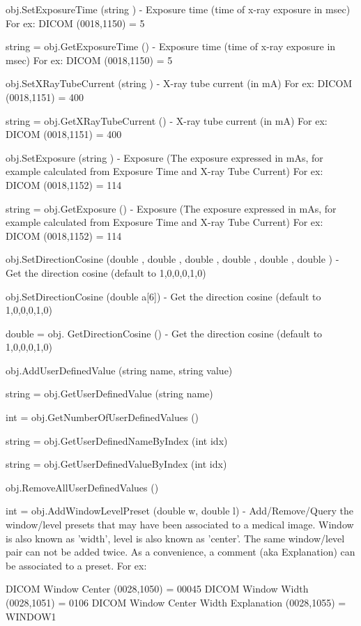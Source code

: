 \begin{DoxyItemize}
\item {\ttfamily obj.\-Set\-Exposure\-Time (string )} -\/ Exposure time (time of x-\/ray exposure in msec) For ex\-: D\-I\-C\-O\-M (0018,1150) = 5  
\item {\ttfamily string = obj.\-Get\-Exposure\-Time ()} -\/ Exposure time (time of x-\/ray exposure in msec) For ex\-: D\-I\-C\-O\-M (0018,1150) = 5  
\item {\ttfamily obj.\-Set\-X\-Ray\-Tube\-Current (string )} -\/ X-\/ray tube current (in m\-A) For ex\-: D\-I\-C\-O\-M (0018,1151) = 400  
\item {\ttfamily string = obj.\-Get\-X\-Ray\-Tube\-Current ()} -\/ X-\/ray tube current (in m\-A) For ex\-: D\-I\-C\-O\-M (0018,1151) = 400  
\item {\ttfamily obj.\-Set\-Exposure (string )} -\/ Exposure (The exposure expressed in m\-As, for example calculated from Exposure Time and X-\/ray Tube Current) For ex\-: D\-I\-C\-O\-M (0018,1152) = 114  
\item {\ttfamily string = obj.\-Get\-Exposure ()} -\/ Exposure (The exposure expressed in m\-As, for example calculated from Exposure Time and X-\/ray Tube Current) For ex\-: D\-I\-C\-O\-M (0018,1152) = 114  
\item {\ttfamily obj.\-Set\-Direction\-Cosine (double , double , double , double , double , double )} -\/ Get the direction cosine (default to 1,0,0,0,1,0)  
\item {\ttfamily obj.\-Set\-Direction\-Cosine (double a\mbox{[}6\mbox{]})} -\/ Get the direction cosine (default to 1,0,0,0,1,0)  
\item {\ttfamily double = obj. Get\-Direction\-Cosine ()} -\/ Get the direction cosine (default to 1,0,0,0,1,0)  
\item {\ttfamily obj.\-Add\-User\-Defined\-Value (string name, string value)}  
\item {\ttfamily string = obj.\-Get\-User\-Defined\-Value (string name)}  
\item {\ttfamily int = obj.\-Get\-Number\-Of\-User\-Defined\-Values ()}  
\item {\ttfamily string = obj.\-Get\-User\-Defined\-Name\-By\-Index (int idx)}  
\item {\ttfamily string = obj.\-Get\-User\-Defined\-Value\-By\-Index (int idx)}  
\item {\ttfamily obj.\-Remove\-All\-User\-Defined\-Values ()}  
\item {\ttfamily int = obj.\-Add\-Window\-Level\-Preset (double w, double l)} -\/ Add/\-Remove/\-Query the window/level presets that may have been associated to a medical image. Window is also known as 'width', level is also known as 'center'. The same window/level pair can not be added twice. As a convenience, a comment (aka Explanation) can be associated to a preset. For ex\-: \begin{DoxyVerb}         DICOM Window Center (0028,1050) = 00045
         DICOM Window Width  (0028,1051) = 0106
         DICOM Window Center Width Explanation (0028,1055) = WINDOW1\end{DoxyVerb}
  

\end{DoxyItemize}
